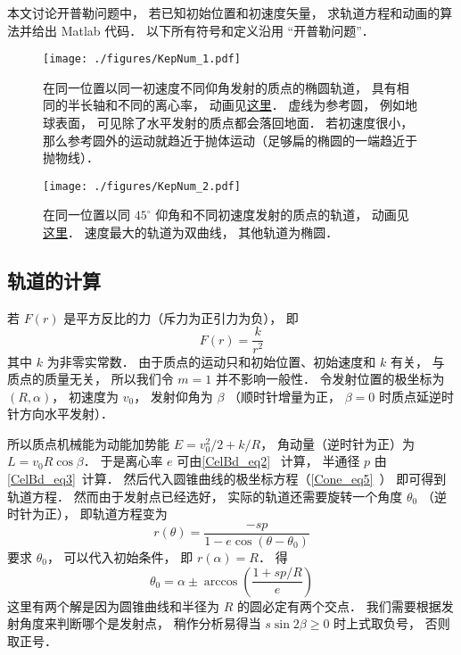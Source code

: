 
\begin{issues}
\end{issues}


本文讨论开普勒问题中， 若已知初始位置和初速度矢量， 求轨道方程和动画的算法并给出 Matlab 代码． 以下所有符号和定义沿用 “开普勒问题”．
\begin{figure}[ht]
\centering
\texttt{[image: ./figures/KepNum\_1.pdf]}
\caption{在同一位置以同一初速度不同仰角发射的质点的椭圆轨道， 具有相同的半长轴和不同的离心率， 动画见\href{https://wuli.wiki/apps/Kepler.html}{这里}． 虚线为参考圆， 例如地球表面， 可见除了水平发射的质点都会落回地面． 若初速度很小， 那么参考圆外的运动就趋近于抛体运动（足够扁的椭圆的一端趋近于抛物线）．} \label{KepNum_fig1}
\end{figure}

\begin{figure}[ht]
\centering
\texttt{[image: ./figures/KepNum\_2.pdf]}
\caption{在同一位置以同 $45^\circ$ 仰角和不同初速度发射的质点的轨道， 动画见\href{https://wuli.wiki/apps/Kepler2.html}{这里}． 速度最大的轨道为双曲线， 其他轨道为椭圆．} \label{KepNum_fig2}
\end{figure}

\subsection{轨道的计算}
若 $F(r)$ 是平方反比的力（斥力为正引力为负）， 即
\begin{equation}
F(r) = \frac{k}{r^2}
\end{equation}
其中 $k$ 为非零实常数． 由于质点的运动只和初始位置、初始速度和 $k$ 有关， 与质点的质量无关， 所以我们令 $m=1$ 并不影响一般性． 令发射位置的极坐标为 $(R,\alpha)$， 初速度为 $v_0$， 发射仰角为 $\beta$ （顺时针增量为正， $\beta=0$ 时质点延逆时针方向水平发射）．

所以质点机械能为动能加势能 $E = v_0^2/2 + k/R$， 角动量（逆时针为正）为 $L = v_0 R\cos\beta$． 于是离心率 $e$ 可由\autoref{CelBd_eq2}~ 计算， 半通径 $p$ 由\autoref{CelBd_eq3}~计算． 然后代入圆锥曲线的极坐标方程（\autoref{Cone_eq5}~） 即可得到轨道方程． 然而由于发射点已经选好， 实际的轨道还需要旋转一个角度 $\theta_0$ （逆时针为正）， 即轨道方程变为
\begin{equation}\label{KepNum_eq1}
r(\theta)  = \frac{-s p}{1 - e\cos (\theta-\theta_0)}
\end{equation}
要求 $\theta_0$， 可以代入初始条件， 即 $r(\alpha) = R$． 得
\begin{equation}
\theta_0 = \alpha \pm \arccos(\frac{1+ sp/R}{e})
\end{equation}
这里有两个解是因为圆锥曲线和半径为 $R$ 的圆必定有两个交点． 我们需要根据发射角度来判断哪个是发射点， 稍作分析易得当 $s\sin2\beta \geqslant 0$ 时上式取负号， 否则取正号．

